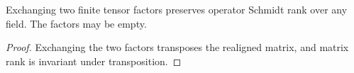 \begin{theorem}
    \label{thm:operator_schmidt_factor_exchange}
    \leanok
    Exchanging two finite tensor factors preserves operator Schmidt
    rank over any field. The factors may be empty.
\end{theorem}
\begin{proof}\leanok
    Exchanging the two factors transposes the realigned matrix,
    and matrix rank is invariant under transposition.
\end{proof}

